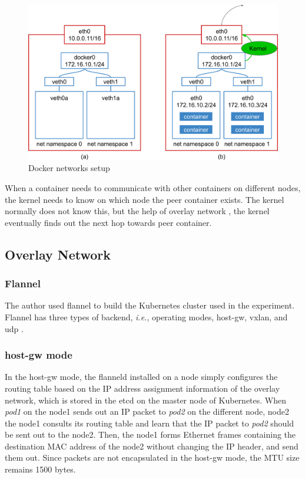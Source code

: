 \begin{figure}[h]
  \centering
  \includegraphics[width=0.8\columnwidth]{Figs/bridge+veth}

  \par\bigskip
  \centering
  \begin{minipage}{0.9\columnwidth}
    \caption[Docker networks setup]{
      Docker networks setup
    }
    \label{fig:bridge+veth}
  \end{minipage}
\end{figure}
 
When a container needs to communicate with other containers on different nodes, the kernel needs to know on which node the peer container exists.
The kernel normally does not know this, but  the help of overlay network \cite{zismer2016performance}, the kernel eventually finds out the next hop towards peer container.

\FloatBarrier

\subsection{Overlay Network}

\subsubsection{Flannel}

The author used flannel to build the Kubernetes cluster used in the experiment.
Flannel has three types of backend, {\it i.e.}, operating modes, host-gw, vxlan, and udp \cite{CoreOSFlannelBackend}.

\subsubsection{host-gw mode}

In the host-gw mode, the flanneld installed on a node simply configures the routing table  
based on the IP address assignment information of the overlay network, which is stored in the etcd on the master node of Kubernetes.
When {\em pod1} on the node1 sends out an IP packet to {\em pod2} on the different node, node2\added{,} 
the node1 consults its routing table and learn that the IP packet to {\em pod2} should be sent out to the node2.
Then, the node1 forms Ethernet frames containing the destination MAC address of the node2 
without changing the IP header, and send them out.
Since packets are not encapsulated in the host-gw mode, the MTU size remains 1500 bytes.

